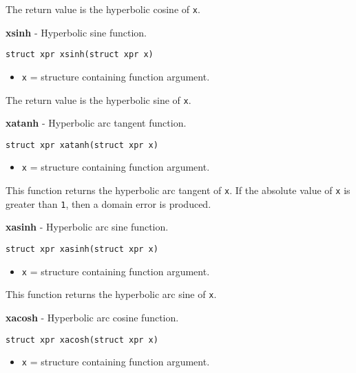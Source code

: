 \documentclass{article}
\begin{document}
The return value is the hyperbolic cosine of \texttt{x}.


\hrulefill{}

\textbf{xsinh} - Hyperbolic sine function.

\begin{verbatim}
struct xpr xsinh(struct xpr x)
\end{verbatim}

\begin{itemize}
\item \texttt{x} = structure containing function argument.
\end{itemize}

The return value is the hyperbolic sine of \texttt{x}.


\hrulefill{}

\textbf{xatanh} - Hyperbolic arc tangent function.

\begin{verbatim}
struct xpr xatanh(struct xpr x)
\end{verbatim}

\begin{itemize}
\item \texttt{x} = structure containing function argument.
\end{itemize}

This function returns the hyperbolic arc tangent of \texttt{x}.
If the absolute value of \texttt{x}  is  greater  than \texttt{1},
then a domain error is produced.


\hrulefill{}

\textbf{xasinh} - Hyperbolic arc sine function.

\begin{verbatim}
struct xpr xasinh(struct xpr x)
\end{verbatim}

\begin{itemize}
\item \texttt{x} = structure containing function argument.
\end{itemize}

This function  returns the hyperbolic arc sine of \texttt{x}.


\hrulefill{}

\textbf{xacosh} - Hyperbolic arc cosine function.

\begin{verbatim}
struct xpr xacosh(struct xpr x)
\end{verbatim}

\begin{itemize}
\item \texttt{x} = structure containing function argument.
\end{itemize}
\end{document}
